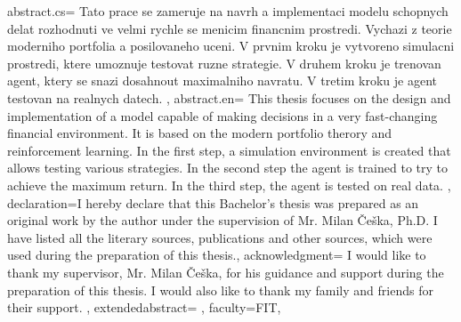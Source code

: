 {	%
	abstract.cs={
			Tato prace se zameruje na navrh a implementaci modelu schopnych
			delat rozhodnuti ve velmi rychle se menicim financnim prostredi. Vychazi z teorie
			moderniho portfolia a posilovaneho uceni. V prvnim kroku je vytvoreno
			simulacni prostredi, ktere umoznuje testovat ruzne strategie. V druhem kroku
			je trenovan agent, ktery se snazi dosahnout maximalniho navratu.
			V tretim kroku je agent testovan na realnych datech.
		}, %
	abstract.en={
			This thesis focuses on the design and implementation of a model capable of
			making decisions in a very fast-changing financial environment. It is based on the
			modern portfolio therory and reinforcement learning.
			In the first step, a simulation environment is created
			that allows testing various strategies. In the second step
			the agent is trained to try to achieve the maximum return.
			In the third step, the agent is tested on real data.
		}, %
	declaration={I hereby declare that this Bachelor's thesis was prepared as an original work by the author under
			the supervision of Mr. Milan Češka, Ph.D. %
			I have listed all the literary sources, publications and other sources, which were used during the preparation of this thesis.},
	acknowledgment={
			I would like to thank my supervisor, Mr. Milan Češka, for his guidance and support during the preparation of this thesis.
			I would also like to thank my family and friends for their support.
		},
	extendedabstract={ %
		},
	faculty={FIT}, %
}

